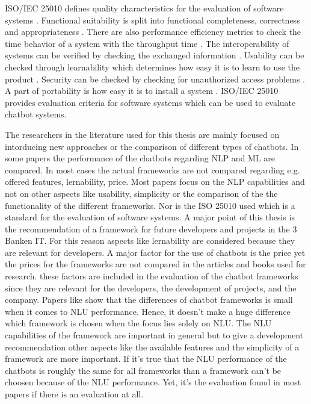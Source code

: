 


ISO/IEC 25010 defines quality characteristics for the evaluation of software systems \cite{iso25010}.
Functional suitability is split into functional completeness, correctness and appropriateness \cite{iso25010}.
There are also performance efficiency metrics to check the time behavior of a system with the throughput time \cite{iso25010}.
The interoperability of systems can be verified by checking the exchanged information \cite{iso25010}.
Usability can be checked through learnability which determines how easy it is to learn to use the product \cite{iso25010}.
Security can be checked by checking for unauthorized access problems \cite{iso25010}.
A part of portability is how easy it is to install a system \cite{iso25010}.
ISO/IEC 25010 provides evaluation criteria for software systems which can be used to evaluate chatbot systems.


The researchers in the literature used for this thesis are mainly focused on intorducing new approaches or the 
comparison of different types of chatbots.
In some papers the performance of the chatbots regarding NLP and ML are compared. 
In most cases the actual frameworks are not compared regarding e.g. offered features, lernability, price.
Most papers focus on the NLP capabilities and not on other aspects like usability, simplicity or the comparison of the 
the functionality of the different frameworks.
Nor is the ISO 25010\cite{iso25010} used which is a standard for the evaluation of software systems.
A major point of this thesis is the recommendation of a framework for future developers and projects in the 
3 Banken IT.
For this reason aspects like lernability are considered because they are relevant for developers.
A major factor for the use of chatbots is the price yet the prices for the frameworks are not compared 
in the articles and books used for research.
these factors are included in the evaluation of the chatbot frameworks since they are relevant for the developers, the development of 
projects, and the company.
Papers like \citet{braunEvaluatingNLU} show that the differences of chatbot frameworks is small when it comes to NLU performance.
Hence, it doesn't make a huge difference which framework is chosen when the focus lies solely on NLU.
The NLU capabilities of the framework are important in general but to give a development recommendation other aspects
like the available features and the simplicity of a framework are more important.
If it's true that the NLU performance of the chatbots is roughly the same for all frameworks than a framework
can't be choosen because of the NLU performance.
Yet, it's the evaluation found in most papers if there is an evaluation at all. 

